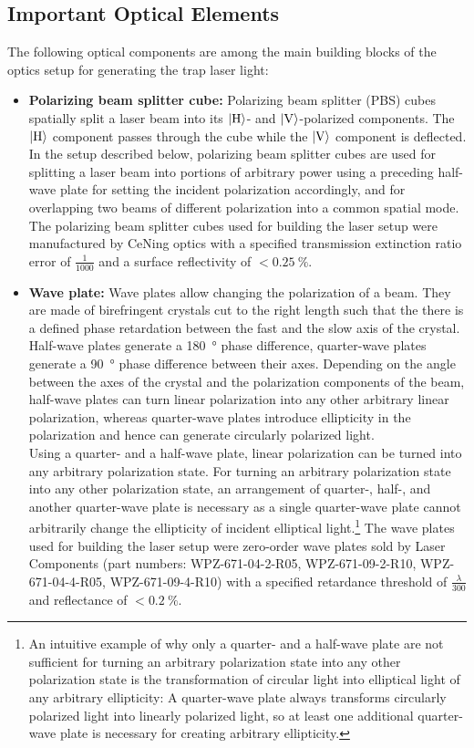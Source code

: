 \subsection*{Important Optical Elements}
The following optical components are among the main building blocks of the optics setup for generating the trap laser light:
\begin{itemize}
    \item \textbf{Polarizing beam splitter cube:} Polarizing beam splitter (PBS) cubes spatially split a laser beam into its $\Ket{\text{H}}$- and $\Ket{\text{V}}$-polarized components. The $\Ket{\text{H}}$ component passes through the cube while the $\Ket{\text{V}}$ component is deflected. In the setup described below, polarizing beam splitter cubes are used for splitting a laser beam into portions of arbitrary power using a preceding half-wave plate for setting the incident polarization accordingly, and for overlapping two beams of different polarization into a common spatial mode. The polarizing beam splitter cubes used for building the laser setup were manufactured by CeNing optics with a specified transmission extinction ratio error of $\frac{1}{1000}$ and a surface reflectivity of $<\SI{0.25}{\percent}$.
    
    \item \textbf{Wave plate:} Wave plates allow changing the polarization of a beam. They are made of birefringent crystals cut to the right length such that the there is a defined phase retardation between the fast and the slow axis of the crystal. Half-wave plates generate a \SI{180}{\degree} phase difference, quarter-wave plates generate a \SI{90}{\degree} phase difference between their axes. Depending on the angle between the axes of the crystal and the polarization components of the beam, half-wave plates can turn linear polarization into any other arbitrary linear polarization, whereas quarter-wave plates introduce ellipticity in the polarization and hence can generate circularly polarized light.\\
    Using a quarter- and a half-wave plate, linear polarization can be turned into any arbitrary polarization state. For turning an arbitrary polarization state into any other polarization state, an arrangement of quarter-, half-, and another quarter-wave plate is necessary as a single quarter-wave plate cannot arbitrarily change the ellipticity of incident elliptical light.\footnote{An intuitive example of why only a quarter- and a half-wave plate are not sufficient for turning an arbitrary polarization state into any other polarization state is the transformation of circular light into elliptical light of any arbitrary ellipticity: A quarter-wave plate always transforms circularly polarized light into linearly polarized light, so at least one additional quarter-wave plate is necessary for creating arbitrary ellipticity.} The wave plates used for building the laser setup were zero-order wave plates sold by Laser Components (part numbers:  WPZ-671-04-2-R05, WPZ-671-09-2-R10, WPZ-671-04-4-R05,  WPZ-671-09-4-R10) with a specified retardance threshold of $\frac{\lambda}{300}$ and reflectance of $<\SI{0.2}{\percent}$.
    

\end{itemize}
